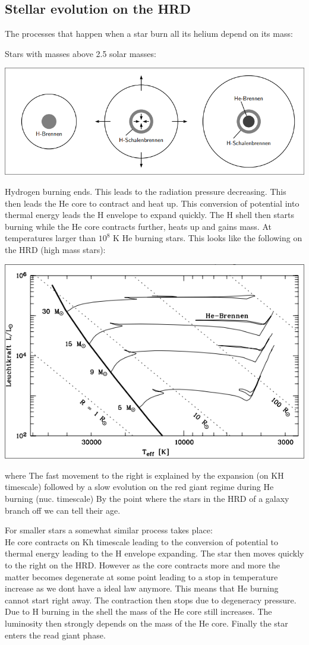\documentclass[11pt,a4paper]{article}
\begin{document}
\subsection{Stellar evolution on the HRD}
The processes that happen when a star burn all its helium depend on its mass: 

Stars with masses above 2.5 solar masses: 
\begin{center}
    \includegraphics[width=0.5\linewidth]{screenshot_2024-01-23-123306.png}
\end{center}
Hydrogen burning ends. This leads to the radiation pressure decreasing. 
This then leads the He core to contract and heat up. 
This conversion of potential into thermal energy leads the H envelope to expand quickly. 
The H shell then starts burning while the He core contracts further, heats up and gains mass. 
At temperatures larger than $10^8$ K He burning stars. 
This looks like the following on the HRD (high mass stars): 
\begin{center}
    \includegraphics[width=0.5\linewidth]{screenshot_2024-01-23-123659.png}
\end{center}
where The fast movement to the right is explained by the expansion (on KH timescale) followed by a slow evolution on the red giant regime during He burning (nuc. timescale)
By the point where the stars in the HRD of a galaxy branch off we can tell their age. 

For smaller stars a somewhat similar process takes place: \\
He core contracts on Kh timescale leading to the conversion of potential to thermal energy leading to the H envelope expanding.
The star then moves quickly to the right on the HRD. 
However as the core contracts more and more the matter becomes degenerate at some point leading to a stop in temperature increase as we dont have a ideal law anymore. 
This means that He burning cannot start right away. 
The contraction then stops due to degeneracy pressure. 
Due to H burning in the shell the mass of the He core still increases. 
The luminosity then strongly depends on the mass of the He core.
Finally the star enters the read giant phase. 
\end{document}
